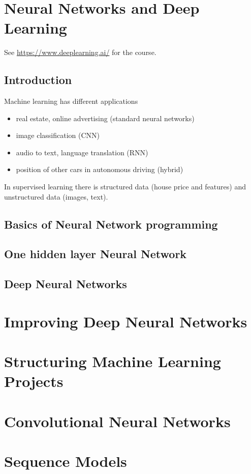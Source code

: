 \documentclass{article}
\begin{document}
\section{Neural Networks and Deep Learning}
See \url{https://www.deeplearning.ai/} for the course.
\subsection{Introduction}
Machine learning has different applications
\begin{itemize}
\item real estate, online advertising (standard neural networks)
\item image classification (CNN)
\item audio to text, language translation (RNN)
\item position of other cars in autonomous driving (hybrid)
\end{itemize}

In supervised learning there is structured data (house price and features)
and unstructured data (images, text).

\subsection{Basics of Neural Network programming}
\subsection{One hidden layer Neural Network}
\subsection{Deep Neural Networks}

\section{Improving Deep Neural Networks}
\section{Structuring Machine Learning Projects}
\section{Convolutional Neural Networks}
\section{Sequence Models}
\end{document}
